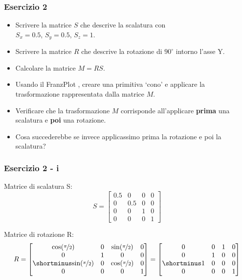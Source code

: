 \documentclass{beamer}
\newcommand{\frnzplt}{FranzPlot }
\begin{document}
\begin{frame}
\frametitle{Esercizio 2}
\begin{itemize}
    \item Scrivere la matrice $S$ che descrive la scalatura con \\ $S_x = 0.5$, $S_y = 0.5$, $S_z = 1$.
    \item Scrivere la matrice $R$ che descrive la rotazione di $90^\circ$ intorno l'asse Y.
    \item Calcolare la matrice $M = R S$.
    \item Usando il \frnzplt, creare una primitiva `cono' e applicare la trasformazione rappresentata dalla matrice $M$.
    \item Verificare che la trasformazione $M$ corrisponde all'applicare \textbf{prima} una scalatura e \textbf{poi} una rotazione.
    \item Cosa succederebbe se invece applicassimo prima la rotazione e poi la scalatura? 
\end{itemize}
\end{frame}

\begin{frame}
\frametitle{Esercizio 2 - i}
Matrice di scalatura S:
\begin{displaymath}
S = 
\begin{bmatrix}
    0.5 & 0   & 0   & 0 \\
      0 & 0.5 & 0   & 0 \\
      0 & 0   & 1   & 0 \\
      0 & 0   & 0   & 1 
\end{bmatrix}
\end{displaymath}

Matrice di rotazione R:
\begin{displaymath}
R = 
\begin{bmatrix}
    \mbox{cos}(\nicefrac{\pi}{2}) & 0 & \mbox{sin}(\nicefrac{\pi}{2}) & 0\\
        0 & 1 & 0 & 0 \\
        \shortminus \mbox{sin}(\nicefrac{\pi}{2}) & 0 & \mbox{cos}(\nicefrac{\pi}{2}) & 0 \\
    0 & 0 & 0 & 1 
\end{bmatrix}
=
\begin{bmatrix}
        0 & 0 & 1 & 0\\
        0 & 1 & 0 & 0 \\
        \shortminus 1 & 0 & 0 & 0 \\
    0 & 0 & 0 & 1 
\end{bmatrix}
\end{displaymath}
\end{frame}
\end{document}
